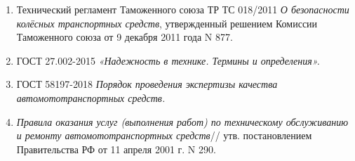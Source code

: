 \begin{enumerate}
\item 
Технический регламент Таможенного союза ТР ТС 018/2011 \emph{О безопасности колёсных транспортных средств},  утвержденный решением Комиссии Таможенного союза от 9 декабря 2011 года N 877.
\item 
ГОСТ 27.002-2015  \emph{«Надежность в технике. Термины и определения».}
\item 
ГОСТ 58197-2018 \emph{Порядок проведения экспертизы качества автомототранспортных средств.}
%
\item \emph
{Правила оказания услуг (выполнения работ) по техническому обслуживанию и ремонту автомототранспортных средств}// утв. постановлением Правительства РФ от 11 апреля 2001 г. N 290.


\end{enumerate}
